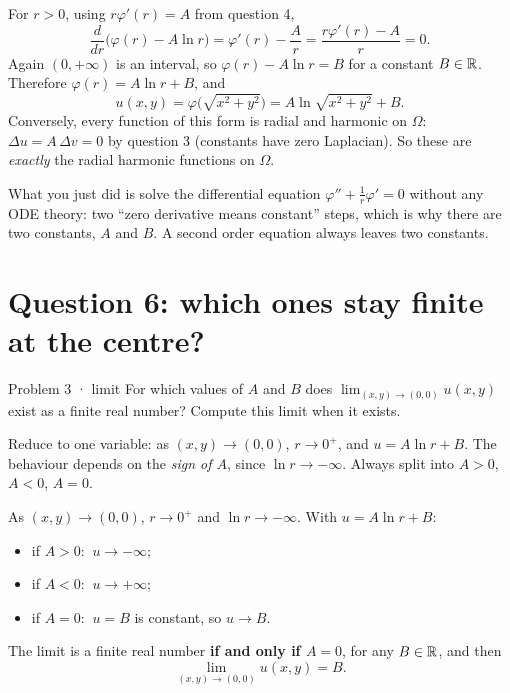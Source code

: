 \begin{answer}
For $r>0$, using $r\varphi'(r)=A$ from question 4,
\[
  \frac{d}{dr}\big(\varphi(r)-A\ln r\big)=\varphi'(r)-\frac Ar=\frac{r\varphi'(r)-A}{r}=0 .
\]
Again $(0,+\infty)$ is an interval, so $\varphi(r)-A\ln r=B$ for a constant $B\in\mathbb{R}$. Therefore
$\varphi(r)=A\ln r+B$, and
\[
  u(x,y)=\varphi\big(\sqrt{x^2+y^2}\big)=A\ln\sqrt{x^2+y^2}+B .
\]
Conversely, every function of this form is radial and harmonic on $\Omega$: $\Delta u=A\,\Delta v=0$ by
question 3 (constants have zero Laplacian). So these are \emph{exactly} the radial harmonic functions on $\Omega$.
\end{answer}

\begin{intuition}
What you just did is solve the differential equation $\varphi''+\frac1r\varphi'=0$ without any ODE theory:
two ``zero derivative means constant'' steps, which is why there are two constants, $A$ and $B$. A
second order equation always leaves two constants.
\end{intuition}

\section{Question 6: which ones stay finite at the centre?}

\begin{question}{Problem 3 \;·\; limit}
For which values of $A$ and $B$ does $\displaystyle\lim_{(x,y)\to(0,0)}u(x,y)$ exist as a finite real
number? Compute this limit when it exists.
\end{question}

\begin{lesson}
Reduce to one variable: as $(x,y)\to(0,0)$, $r\to0^+$, and $u=A\ln r+B$. The behaviour depends on the
\emph{sign of $A$}, since $\ln r\to-\infty$. Always split into $A>0$, $A<0$, $A=0$.
\end{lesson}

\begin{answer}
As $(x,y)\to(0,0)$, $r\to0^+$ and $\ln r\to-\infty$. With $u=A\ln r+B$:
\begin{itemize}
  \item if $A>0$: $\ u\to-\infty$;
  \item if $A<0$: $\ u\to+\infty$;
  \item if $A=0$: $\ u=B$ is constant, so $u\to B$.
\end{itemize}
The limit is a finite real number \textbf{if and only if $A=0$}, for any $B\in\mathbb{R}$, and then
\[
  \lim_{(x,y)\to(0,0)}u(x,y)=B .
\]
\end{answer}

